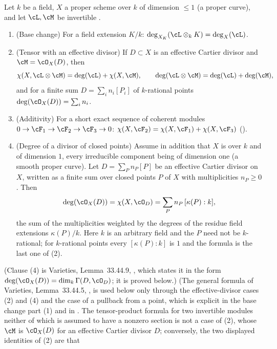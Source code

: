 \begin{lemma}
\label{lem:pc-degree-base-change}
Let $k$ be a field, $X$ a proper scheme over $k$ of dimension $\le1$
(a proper curve), and let $\cL,\cM$ be invertible
.
\begin{enumerate}
\item (Base change) For a field extension $K/k$:
$\deg_{X_K}(\cL\otimes_kK)=\deg_X(\cL)$.
\item (Tensor with an effective divisor) If $D\subset X$ is an
effective Cartier divisor and $\cM=\cO_X(D)$, then
\[
\chi(X,\cL\otimes\cM)=\deg(\cL)+\chi(X,\cM),\qquad
\deg(\cL\otimes\cM)=\deg(\cL)+\deg(\cM),
\]
and for a finite sum $D=\sum_in_i[P_i]$ of $k$-rational points
$\deg(\cO_X(D))=\sum_in_i$.
\item (Additivity) For a short exact sequence of coherent modules
$0\to\cF_1\to\cF_2\to\cF_3\to0$:
$\chi(X,\cF_2)=\chi(X,\cF_1)+\chi(X,\cF_3)$
().
\item (Degree of a divisor of closed points) Assume in addition that $X$
is  over $k$ and of dimension
$1$, every irreducible component being of dimension one (a smooth
proper curve).  Let
$D=\sum_Pn_P[P]$ be an effective Cartier divisor on $X$, written as a
finite sum over closed points $P$ of $X$ with multiplicities $n_P\ge0$.
Then
\[
\deg(\cO_X(D))=\chi(X,\cO_D)=\sum_Pn_P\,[\kappa(P):k],
\]
the sum of the multiplicities weighted by the degrees of the residue
field extensions $\kappa(P)/k$.  Here $k$ is an arbitrary field and the
$P$ need not be $k$-rational; for $k$-rational points every
$[\kappa(P):k]$ is $1$ and the formula is the last one of (2).
\end{enumerate}
(Clause (4) is Varieties, Lemma~33.44.9, , which
states it in the form $\deg(\cO_X(D))=\dim_k\Gamma(D,\cO_D)$; it is
proved below.)
(The general formula of Varieties, Lemma~33.44.5,
, is used below only through the effective-divisor
cases (2) and (4) and the case of a pullback from a point, which is
explicit in the base change part (1) and in
.  The tensor-product formula for two
invertible modules neither of which is assumed to have a nonzero section
is not a case of (2), whose $\cM$ is $\cO_X(D)$ for an effective Cartier
divisor $D$; conversely, the two displayed identities of (2) are that

\end{lemma}
